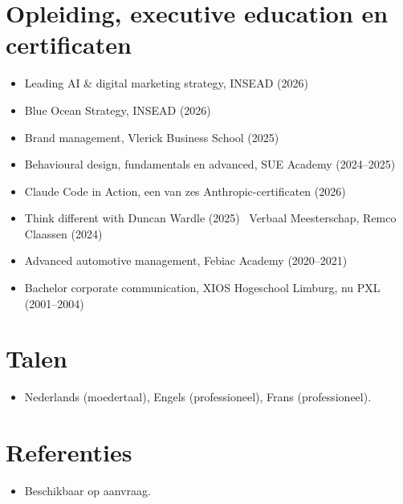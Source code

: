 \documentclass[11pt,a4paper,sans]{moderncv}
\begin{document}

\section{Opleiding, executive education en certificaten}
\vspace{1pt}
\begin{itemize}
\item Leading AI \& digital marketing strategy, INSEAD (2026)
\item Blue Ocean Strategy, INSEAD (2026)
\item Brand management, Vlerick Business School (2025)
\item Behavioural design, fundamentals en advanced, SUE Academy (2024--2025)
\item Claude Code in Action, een van zes Anthropic-certificaten (2026)
\item Think different with Duncan Wardle (2025) \textperiodcentered\ Verbaal Meesterschap, Remco Claassen (2024)
\item Advanced automotive management, Febiac Academy (2020--2021)
\item Bachelor corporate communication, XIOS Hogeschool Limburg, nu PXL (2001--2004)
\end{itemize}


\section{Talen}
\vspace{1pt}
\begin{itemize}
\item Nederlands (moedertaal), Engels (professioneel), Frans (professioneel).
\end{itemize}


\section{Referenties}
\vspace{1pt}
\begin{itemize}
\item{Beschikbaar op aanvraag.}
\end{itemize}
\end{document}
